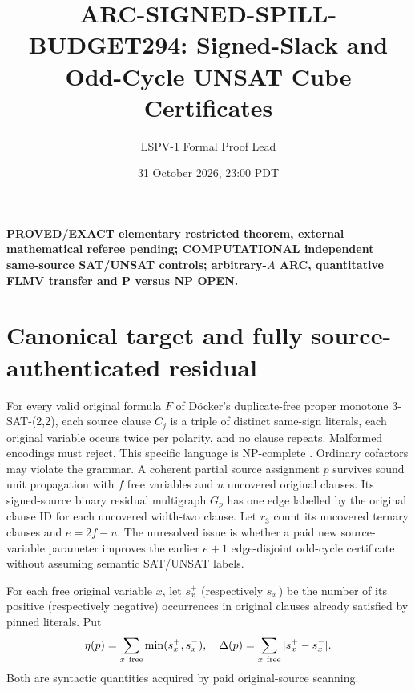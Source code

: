 \documentclass[11pt]{article}
\title{ARC-SIGNED-SPILL-BUDGET294: Signed-Slack and Odd-Cycle UNSAT Cube Certificates}
\author{LSPV-1 Formal Proof Lead}
\date{31 October 2026, 23:00 PDT}
\begin{document}
\maketitle
\noindent\textbf{PROVED/EXACT elementary restricted theorem, external mathematical referee pending; COMPUTATIONAL independent same-source SAT/UNSAT controls; arbitrary-$A$ ARC, quantitative FLMV transfer and P versus NP OPEN.}

\section{Canonical target and fully source-authenticated residual}
For every valid original formula $F$ of D\"ocker's duplicate-free proper monotone 3-SAT-(2,2), each source clause $C_j$ is a triple of distinct same-sign literals, each original variable occurs twice per polarity, and no clause repeats. Malformed encodings must reject. This specific language is NP-complete \cite{doecker}. Ordinary cofactors may violate the grammar. A coherent partial source assignment $p$ survives sound unit propagation with $f$ free variables and $u$ uncovered original clauses. Its signed-source binary residual multigraph $G_p$ has one edge labelled by the original clause ID for each uncovered width-two clause. Let $r_3$ count its uncovered ternary clauses and $e=2f-u$. The unresolved issue is whether a paid new source-variable parameter improves the earlier $e+1$ edge-disjoint odd-cycle certificate without assuming semantic SAT/UNSAT labels.

For each free original variable $x$, let $s_x^+$ (respectively $s_x^-$) be the number of its positive (respectively negative) occurrences in original clauses already satisfied by pinned literals. Put
\[
\eta(p)=\sum_{x\ {\rm free}}\min(s_x^+,s_x^-),
\quad \Delta(p)=\sum_{x\ {\rm free}}|s_x^+-s_x^-|.
\]
Both are syntactic quantities acquired by paid original-source scanning.
\end{document}
